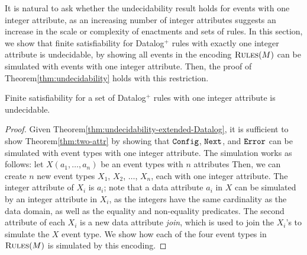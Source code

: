 It is natural to ask whether the undecidability result
holds for events with one integer attribute,
as an increasing number of integer attributes
suggests an increase in the scale or complexity
of enactments and sets of rules.
In this section, we show that finite satisfiability
for Datalog$^{+}$ rules with
exactly one integer attribute
is undecidable,
by showing
all events in the encoding $\textsc{Rules}(M)$
can be simulated with events
with one integer attribute.
Then, the proof of Theorem\:\ref{thm:undecidability}
holds with this restriction.

\begin{thm}\label{thm:two-attr}
Finite satisfiability for a set of Datalog$^{+}$ rules
with one integer attribute is undecidable.
\end{thm}

\begin{proof}
Given Theorem\:\ref{thm:undecidability-extended-Datalog},
it is sufficient to show
Theorem\:\ref{thm:two-attr}
by showing that
$\texttt{Config}$, $\texttt{Next}$, and $\texttt{\tt Error}$
can be simulated with event types with one integer attribute.
The simulation works as follows:
let $X(a_1,\dots,a_n)$ be an event types with $n$ attributes
Then, we can create $n$ new event types
$X_1$, $X_2$, $\dots$, $X_n$,
each with one integer attribute.
The integer attribute of $X_i$ is $a_i$;
note that a data attribute $a_i$ in $X$ can be simulated
by an integer attribute in $X_i$,
as the integers have the same cardinality as the data domain,
as well as the equality and non-equality predicates.
The second attribute of each $X_i$ is a new data attribute {\em join},
which is used to join the $X_i$'s to simulate the $X$ event type.
We show how each of the four event types in $\textsc{Rules}(M)$
is simulated by this encoding.


\end{proof}
